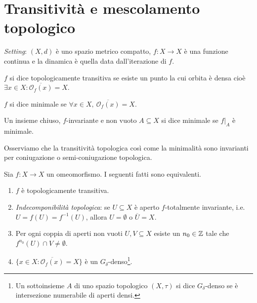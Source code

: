 \section{Transitività e mescolamento topologico}
\emph{Setting}: $ (X, d) $ è uno spazio metrico compatto, $ f \colon X \to X $ è una funzione continua e la dinamica è quella data dall'iterazione di $ f $. 

\begin{definition}
    $ f $ si dice topologicamente transitiva se esiste un punto la cui orbita è densa cioè $ \exists x \in X : \overline{\mathcal{O}_f(x)} = X $.
\end{definition}

\begin{definition}
    $ f $ si dice minimale se $ \forall x \in X, \ \overline{\mathcal{O}_f(x)} = X $.
\end{definition}

\begin{definition}
    Un insieme chiuso, $ f $-invariante e non vuoto $ A \subseteq X $ si dice minimale se $ f\lvert_A $ è minimale.
\end{definition}

Osserviamo che la transitività topologica così come la minimalità sono invarianti per coniugazione o semi-coniugazione topologica.

\begin{thm}
    Sia $ f \colon X \to X $ un omeomorfismo. I seguenti fatti sono equivalenti.
    \begin{enumerate}[label=(\roman*)]
        \item $ f $ è topologicamente transitiva.
        \item \emph{Indecomponibilità topologica}: se $ U \subseteq X $ è aperto $ f $-totalmente invariante, i.e. $ U = f(U) = f^{-1}(U) $, allora $ U = \emptyset $ o $ \overline{U} = X $.
        \item Per ogni coppia di aperti non vuoti $ U, V \subseteq X $ esiste un $ n_0 \in \mathbb{Z} $ tale che $ f^{n_0}(U) \cap V \neq \emptyset $.
        \item $ \{x \in X : \overline{\mathcal{O}_f(x)} = X\} $ è un $ G_\delta $-denso\footnote{%
            Un sottoinsieme $ A $ di uno spazio topologico $ (X, \tau) $ si dice $ G_\delta $-denso se è intersezione numerabile di aperti densi.
        }.
    \end{enumerate}
\end{thm}

